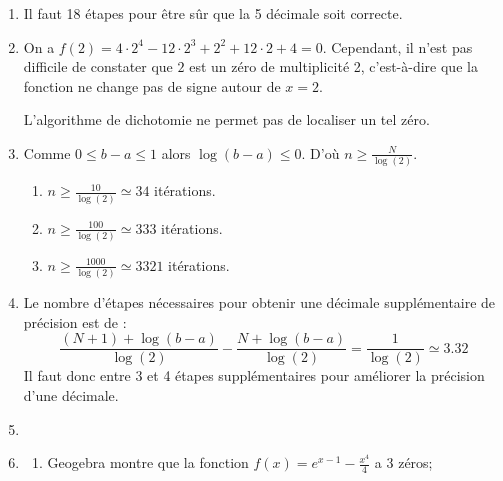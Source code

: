 \begin{enumerate}[label=R4.\arabic*, font=\bfseries, itemsep=8mm,labelsep*=4mm]
\item
Il faut 18 étapes pour être sûr que la 5 décimale soit correcte.






\item
On a $f(2)=4\cdot 2^4-12\cdot 2^3+2^2+12\cdot 2+4=0$.
Cependant, il n'est pas difficile de constater que $2$ est un zéro de multiplicité 2, c'est-à-dire que la fonction ne change pas de signe autour de $x=2$.

L'algorithme de dichotomie ne permet pas de localiser un tel zéro.






\item
Comme $0\leqslant b-a\leqslant 1$ alors $\log\left(b-a\right)\leqslant 0$. D'où $n\geqslant \frac{N}{\log(2)}$.
\begin{enumerate}[label=\roman*), itemsep=3mm]
\item $n\geqslant \frac{10}{\log(2)}\simeq 34$ itérations.
\item $n\geqslant \frac{100}{\log(2)}\simeq 333$ itérations.
\item $n\geqslant \frac{1000}{\log(2)}\simeq 3321$ itérations.
\end{enumerate}






\item
Le nombre d'étapes nécessaires pour obtenir une décimale supplémentaire de précision est de :
$$\frac{(N+1)+\log(b-a)}{\log(2)}-\frac{N+\log(b-a)}{\log(2)}=\frac{1}{\log(2)}\simeq 3.32$$
Il faut donc entre 3 et 4 étapes supplémentaires pour améliorer la précision d'une décimale.







\item
{}







\item
\begin{enumerate}[label=\roman*),itemsep=4mm]
\item Geogebra montre que la fonction $f(x)=e^{x-1}-\frac{x^4}{4}$  a 3 zéros;


\end{enumerate}
\end{enumerate}
